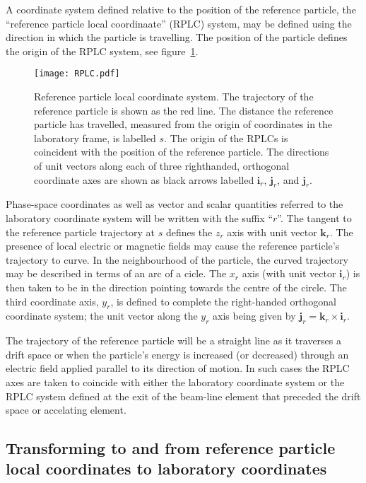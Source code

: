 A coordinate system defined relative to the position of the reference
particle, the ``reference particle local coordinaate'' (RPLC) system,
may be defined using the direction in which the particle is
travelling. 
The position of the particle defines the origin of the RPLC system,
see figure~\ref{fig:RPLC}.
\begin{figure}
  \begin{center}
    \texttt{[image: RPLC.pdf]}
  \end{center}
  \caption{
    Reference particle local coordinate system.
    The trajectory of the reference particle is shown as the red line.
    The distance the reference particle has travelled, measured from
    the origin of coordinates in the laboratory frame, is labelled
    $s$.
    The origin of the RPLCs is coincident with the position of the
    reference particle.
    The directions of unit vectors along each of three righthanded,
    orthogonal coordinate axes are shown as black arrows labelled
    $\bm{i}_r$, $\bm{j}_r$, and $\bm{j}_r$. 
  }
  \label{fig:RPLC}
\end{figure}

Phase-space coordinates as well as vector and scalar quantities
referred to the laboratory coordinate system will be written with the
suffix ``$r$''. 
The tangent to the reference particle trajectory at $s$ defines the
$z_r$ axis with unit vector $\bm{k}_r$.
The presence of local electric or magnetic fields may cause the
reference particle's trajectory to curve.
In the neighbourhood of the particle, the curved trajectory may be
described in terms of an arc of a cicle.
The $x_r$ axis (with unit vector $\bm{i}_r$) is then taken to be in
the direction pointing towards the centre of the circle.
The third coordinate axis, $y_r$, is defined to complete the
right-handed orthogonal coordinate system; the unit vector along the
$y_r$ axis being given by $\bm{j}_r = \bm{k}_r \times \bm{i}_r$.

The trajectory of the reference particle will be a straight line as it
traverses a drift space or when the particle's energy is increased (or
decreased) through an electric field applied parallel to its direction
of motion.
In such cases the RPLC axes are taken to coincide with either the
laboratory coordinate system or the RPLC system defined at the exit of
the beam-line element that preceded the drift space or accelating
element.

\subsection{Transforming to and from reference particle local
            coordinates to laboratory coordinates}


